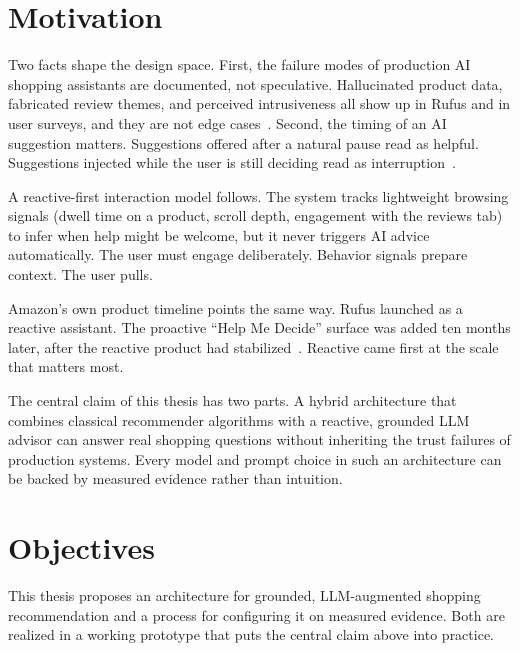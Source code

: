 \section{Motivation}
\label{sec:intro-motivation}

Two facts shape the design space. First, the failure modes of
production AI shopping assistants are documented, not
speculative. Hallucinated product data, fabricated review themes,
and perceived intrusiveness all show up in Rufus and in user
surveys, and they are not edge
cases~\cite{RufusWrong2024,ConsumerResistanceAI}. Second, the
timing of an AI suggestion matters. Suggestions offered after a
natural pause read as helpful. Suggestions injected while the
user is still deciding read as
interruption~\cite{CHI2024Timing,ProactiveReactivePersonalization}.

A reactive-first interaction model follows. The system tracks
lightweight browsing signals (dwell time on a product, scroll
depth, engagement with the reviews tab) to infer when help might
be welcome, but it never triggers AI advice automatically. The
user must engage deliberately. Behavior signals prepare context. The user
pulls.

Amazon's own product timeline points the same way. Rufus
launched as a reactive assistant. The proactive ``Help Me Decide'' surface was
added ten months later, after the reactive product had
stabilized~\cite{RufusTechnology,RufusScaling}. Reactive came
first at the scale that matters most.

The central claim of this thesis has two parts. A hybrid
architecture that combines classical recommender algorithms with
a reactive, grounded LLM advisor can answer real shopping
questions without inheriting the trust failures of production
systems. Every model and prompt choice in such an architecture
can be backed by measured evidence rather than intuition.

\section{Objectives}
\label{sec:intro-objectives}

This thesis proposes an architecture for grounded, LLM-augmented
shopping recommendation and a process for configuring it on
measured evidence. Both are realized in a working prototype that
puts the central claim above into practice.

